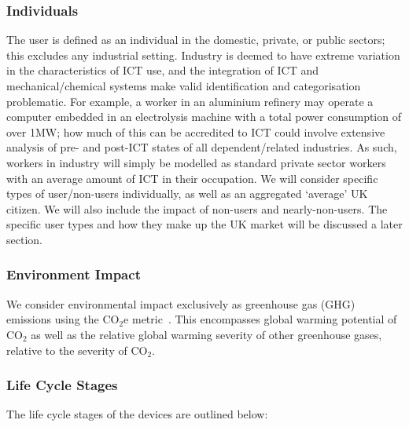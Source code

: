 \documentclass[conference]{IEEEtran}
\begin{document}
\subsubsection{Individuals}

The user is defined as an individual in the domestic, private, or
public sectors; this excludes any industrial setting. Industry is
deemed to have extreme variation in the characteristics of ICT use,
and the integration of ICT and mechanical/chemical systems make valid
identification and categorisation problematic. For example, a worker
in an aluminium refinery may operate a computer embedded in an
electrolysis machine with a total power consumption of over 1MW; how
much of this can be accredited to ICT could involve extensive analysis
of pre- and post-ICT states of all dependent/related industries. As
such, workers in industry will simply be modelled as standard private
sector workers with an average amount of ICT in their occupation.  We
will consider specific types of user/non-users individually, as well
as an aggregated `average' UK citizen. We will also include the impact
of non-users and nearly-non-users. The specific user types and how
they make up the UK market will be discussed a later section.

\subsubsection{Environment Impact}

We consider environmental impact exclusively as greenhouse gas (GHG)
emissions using the CO$_2$e
metric~\cite{bsi2050:2011,ieaco2em:2014}. This encompasses global
warming potential of CO$_2$ as well as the relative global warming
severity of other greenhouse gases, relative to the severity of
CO$_2$.


\subsubsection{Life Cycle Stages}

The life cycle stages of the devices are outlined below:
\end{document}
